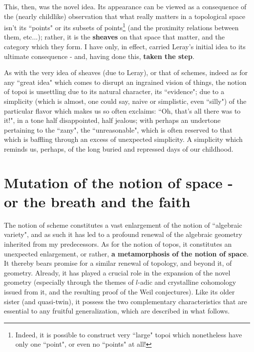 This, then, was the novel idea. Its appearance can be viewed as a consequence of the (nearly childlike) observation that what really matters in a topological space isn't its ``points" or its subsets of points\footnote{Indeed, it is possible to construct very ``large" topoi which nonetheless have only one ``point", or even no ``points" at all!} (and the proximity relations between them, etc...); rather, it is the \textbf{sheaves} on that space that matter, and the category which they form. I have only, in effect, carried Leray's initial idea to its ultimate consequence - and, having done this, \textbf{taken the step}.

As with the very idea of sheaves (due to Leray), or that of schemes, indeed as for any ``great idea" which comes to disrupt an ingrained vision of things, the notion of topoi is unsettling due to its natural character, its ``evidence"; due to a simplicity (which is almost, one could say, naive or simplistic, even ``silly") of the particular flavor which makes us so often exclaims: ``Oh, that's all there was to it!", in a tone half disappointed, half jealous; with perhaps an undertone pertaining to the ``zany", the ``unreasonable", which is often reserved to that which is baffling through an excess of unexpected simplicity. A simplicity which reminds us, perhaps, of the long buried and repressed days of our childhood.

\section{Mutation of the notion of space - or the breath and the faith}

The notion of scheme constitutes a vast enlargement of the notion of ``algebraic variety", and as such it has led to a profound renewal of the algebraic geometry inherited from my predecessors. As for the notion of topos, it constitutes an unexpected enlargement, or rather, \textbf{a metamorphosis of the notion of space}. It thereby bears promise for a similar renewal of topology, and beyond it, of geometry. Already, it has played a crucial role in the expansion of the novel geometry (especially through the themes of $l$-adic and crystalline cohomology issued from it, and the resulting proof of the Weil conjectures). Like its older sister (and quasi-twin), it possess the two complementary characteristics that are essential to any fruitful generalization, which are described in what follows.

